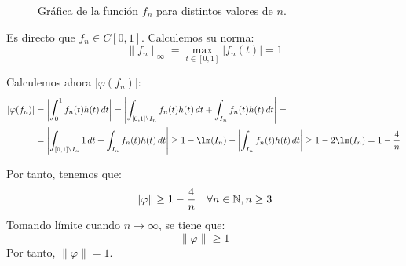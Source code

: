 \documentclass[12pt]{article}
\begin{document}
\begin{ejercicio}
\begin{figure}
            \caption{Gráfica de la función $f_n$ para distintos valores de $n$.}
            \label{fig:fn2}
        \end{figure}

        Es directo que $f_n \in C[0, 1]$. Calculemos su norma:
        \begin{equation*}
            \|f_n\|_\infty = \max_{t \in [0, 1]} |f_n(t)| = 1
        \end{equation*}


        Calculemos ahora $|\varphi(f_n)|$:
        \begin{align*}
            |\varphi(f_n)| &= \left|\int_0^1 f_n(t) h(t)\,dt\right| = \left|\int_{[0, 1] \setminus I_n} f_n(t) h(t)\,dt + \int_{I_n} f_n(t) h(t)\,dt\right| =\\&= \left|\int_{[0, 1] \setminus I_n} 1 \,dt + \int_{I_n} f_n(t) h(t)\,dt\right| \geq 1-\lm(I_n)-\left|\int_{I_n} f_n(t) h(t)\,dt\right|\geq 1-2\lm(I_n) = 1 - \frac{4}{n}
        \end{align*}

        Por tanto, tenemos que:
        \begin{equation*}
            \|\varphi\|\geq 1-\frac{4}{n} \quad \forall n \in \mathbb{N}, n\geq 3
        \end{equation*}
        Tomando límite cuando $n \to \infty$, se tiene que:
        \begin{equation*}
            \|\varphi\| \geq 1
        \end{equation*}
        Por tanto, $\|\varphi\| = 1$.
    \end{ejercicio}
\end{document}
